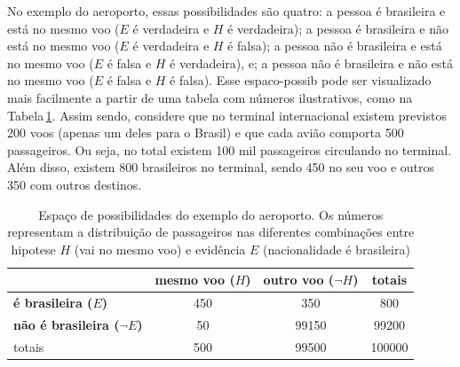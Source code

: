 \documentclass[./main.tex]{subfiles}
\begin{document}
\par No exemplo do aeroporto, essas possibilidades são quatro: a pessoa é brasileira e está no mesmo voo ($E$ é verdadeira e $H$ é verdadeira); a pessoa é brasileira e não está no mesmo voo ($E$ é verdadeira e $H$ é falsa); a pessoa não é brasileira e está no mesmo voo ($E$ é falsa e $H$ é verdadeira), e; a pessoa não é brasileira e não está no mesmo voo ($E$ é falsa e $H$ é falsa). Esse \gls{espaco-possib} pode ser visualizado mais facilmente a partir de uma tabela com números ilustrativos, como na Tabela\,\ref{tbl:bayes-aeroporto}. Assim sendo, considere que no terminal internacional existem previstos 200 voos (apenas um deles para o Brasil) e que cada avião comporta 500 passageiros. Ou seja, no total existem 100 mil passageiros circulando no terminal. Além disso, existem 800 brasileiros no terminal, sendo 450 no seu voo e outros 350 com outros destinos.
\begin{table}[ht]
    \centering	
    \small
    \sffamily
    \begin{tabular}{ l  c  c  c} %
       & \textbf{mesmo voo ($H$)} & \textbf{outro voo ($\neg H$)} & totais\\  
        \hline
        \textbf{é brasileira ($E$)} & 450 & 350 & 800\\
        \textbf{não é brasileira ($\neg E$)} & 50 & 99150 & 99200\\
        \hline
        totais & 500 & 99500 & 100000\\
    \end{tabular}
    \caption[Espaço de possibilidades do exemplo do aeroporto]{Espaço de possibilidades do exemplo do aeroporto. Os números representam a distribuição de passageiros nas diferentes combinações entre \gls{hipotese} $H$ (vai no mesmo voo) e evidência $E$ (nacionalidade é brasileira)}
    \label{tbl:bayes-aeroporto}
\end{table} 
\end{document}
